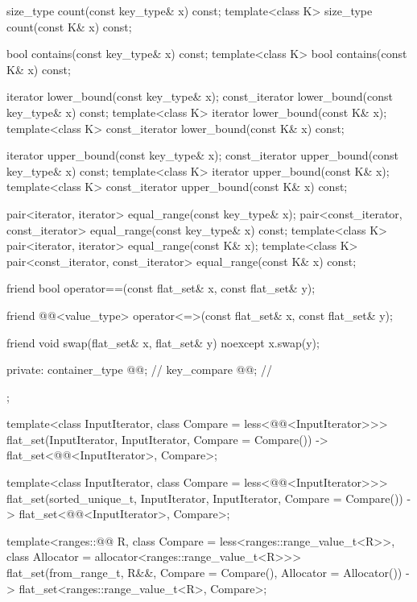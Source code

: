 \begin{codeblock}
{{    size_type count(const key_type& x) const;
    template<class K> size_type count(const K& x) const;

    bool contains(const key_type& x) const;
    template<class K> bool contains(const K& x) const;

    iterator lower_bound(const key_type& x);
    const_iterator lower_bound(const key_type& x) const;
    template<class K> iterator lower_bound(const K& x);
    template<class K> const_iterator lower_bound(const K& x) const;

    iterator upper_bound(const key_type& x);
    const_iterator upper_bound(const key_type& x) const;
    template<class K> iterator upper_bound(const K& x);
    template<class K> const_iterator upper_bound(const K& x) const;

    pair<iterator, iterator> equal_range(const key_type& x);
    pair<const_iterator, const_iterator> equal_range(const key_type& x) const;
    template<class K>
      pair<iterator, iterator> equal_range(const K& x);
    template<class K>
      pair<const_iterator, const_iterator> equal_range(const K& x) const;

    friend bool operator==(const flat_set& x, const flat_set& y);

    friend @@<value_type>
      operator<=>(const flat_set& x, const flat_set& y);

    friend void swap(flat_set& x, flat_set& y) noexcept { x.swap(y); }

  private:
    container_type @@;           // \expos
    key_compare @@;        // \expos
  };

  template<class InputIterator, class Compare = less<@@<InputIterator>>>
    flat_set(InputIterator, InputIterator, Compare = Compare())
      -> flat_set<@@<InputIterator>, Compare>;

  template<class InputIterator, class Compare = less<@@<InputIterator>>>
    flat_set(sorted_unique_t, InputIterator, InputIterator, Compare = Compare())
      -> flat_set<@@<InputIterator>, Compare>;

  template<ranges::@@ R, class Compare = less<ranges::range_value_t<R>>,
          class Allocator = allocator<ranges::range_value_t<R>>>
    flat_set(from_range_t, R&&, Compare = Compare(), Allocator = Allocator())
      -> flat_set<ranges::range_value_t<R>, Compare>;

}
\end{codeblock}
